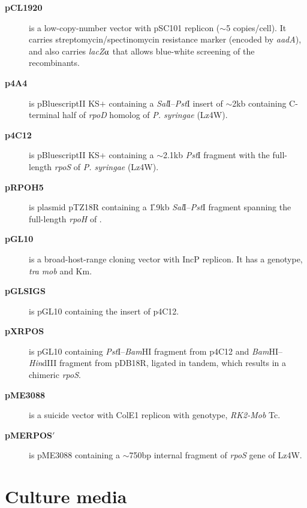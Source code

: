 \begin{description}
    \item[\textbf{pCL1920}] \citep{Lerner1990} is a low-copy-number
    vector with pSC101 replicon ($\sim$5 copies/cell). It
    carries streptomycin/spectinomycin resistance mar\-ker (encoded
    by \emph{aadA}), and also carries \emph{lacZ}$\alphaup$ that
    allows blue-white screening of the recombinants.

    \item[\textbf{p4A4}] is pBluescriptII KS$+$ containing a
    \emph{Sal}I--\emph{Pst}I insert of \U{$\sim$2}{kb} containing C-terminal half of \emph{rpoD} homolog of \emph{P.
    syringae} (Lz4W).

    \item[\textbf{p4C12}] is pBluescriptII KS+ containing a
    \U{$\sim$2.1}{kb} \emph{Pst}I fragment with the
    full-length \emph{rpoS} of \emph{P. syringae} (Lz4W).

    \item[\textbf{pRPOH5}] \citep{Aramaki1996} is plasmid pTZ18R containing a
    \U{1.9}{kb} \emph{Sal}I--\emph{Pst}I fragment spanning the
    full-length \emph{rpoH} of .

    \item[\textbf{pGL10}] \citep{Bidle1999} is a broad-host-range
    cloning vector with IncP replicon. It has a genotype,
    \emph{tra}\su{$-$} \emph{mob}\su{$+$} and Km.

    \item[\textbf{pGLSIGS}] is pGL10 containing the insert of
    p4C12.

    \item[\textbf{pXRPOS}] is pGL10 containing
    \emph{Pst}I--\emph{Bam}HI fragment from p4C12 and
    \emph{Bam}HI--\emph{Hin}dIII fragment from pDB18R, ligated in
    tandem, which results in a chimeric \emph{rpoS}.

    \item[\textbf{pME3088}] \citep{Schnider2000} is a suicide vector with ColE1 replicon with genotype,
    \emph{RK2-Mob} Tc.

    \item[\textbf{pMERPOS$'$}] is pME3088 containing a
    \U{$\sim$750}{bp} internal fragment of \emph{rpoS} gene of
    Lz4W.


\end{description}




\section{Culture media}

